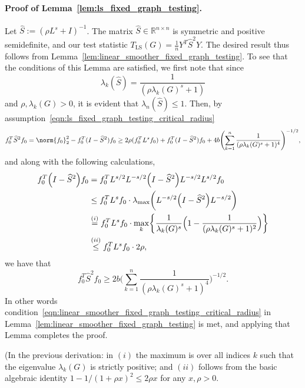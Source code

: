 \documentclass[twoside]{article}
\newcommand{\Reals}{\mathbb{R}}
\newcommand{\1}{\mathbf{1}}
\newcommand{\Lap}{L}
\newcommand{\Id}{I}
\newcommand{\wh}[1]{\widehat{#1}}
\newcommand{\LS}{\mathrm{LS}}
\theoremstyle{definition}
\theoremstyle{remark}
\begin{document}
\paragraph{Proof of Lemma~\ref{lem:ls_fixed_graph_testing}.}
Let $\wh{S} := (\rho \Lap^s + \Id)^{-1}$. The matrix $\wh{S} \in \Reals^{n \times n}$ is symmetric and positive semidefinite, and our test statistic $T_{\LS}(G) = \frac{1}{n}Y^T \wh{S}^2 Y$. The desired result thus follows from Lemma~\ref{lem:linear_smoother_fixed_graph_testing}. To see that the conditions of this Lemma are satisfied, we first note that since
\begin{equation*}
\lambda_k(\wh{S}) = \frac{1}{(\rho\lambda_k(G)^s + 1)}
\end{equation*}
and $\rho, \lambda_k(G) > 0$, it is evident that $\lambda_{n}(\wh{S}) \leq 1$.  Then, by assumption~\eqref{eqn:ls_fixed_graph_testing_critical_radius}
\begin{equation*}
f_0^{T} \wh{S}^2 f_0 = \norm{f_0}_2^2 - f_0^T(I - \wh{S}^2)f_0 \geq 2 \rho (f_0^T \Lap^s f_0) + f_0^T(I - \wh{S}^2)f_0 + 4b \Biggl(\sum_{k = 1}^{n} \frac{1}{(\rho\lambda_k(G)^s + 1)^4} \Biggr)^{-1/2},
\end{equation*}
and along with the following calculations,
\begin{equation*}
\begin{aligned}
f_0^T \Bigl(\Id - \wh{S}^2\Bigr) f_0  & = f_0^T L^{s/2} L^{-s/2}\Bigl(\Id - \wh{S}^2\Bigr) L^{-s/2} L^{s/2} f_0 \\ 
& \leq f_0^T L^{s} f_0 \cdot  \lambda_{\max}\biggl(L^{-s/2}\Bigl(\Id - \wh{S}^2\Bigr) L^{-s/2}\biggr) \\ 
& \overset{(i)}{=}  f_0^T L^{s} f_0 \cdot \max_{k} \biggl\{ \frac{1}{\lambda_k(G)^s} \Bigl(1 - \frac{1}{(\rho \lambda_k(G)^s + 1)^2}\Bigr) \biggr\} \\
& \overset{(ii)}{\leq} f_0^T L^{s} f_0 \cdot 2\rho,
\end{aligned}
\end{equation*}
we have that
\begin{equation*}
f_0^{T} \wh{S}^2 f_0 \geq 2b \biggl(\sum_{k = 1}^{n} \frac{1}{(\rho\lambda_k(G)^s + 1)^4} \biggr)^{-1/2}.
\end{equation*} 
In other words condition~\eqref{eqn:linear_smoother_fixed_graph_testing_critical_radius} in Lemma~\ref{lem:linear_smoother_fixed_graph_testing} is met, and applying that Lemma completes the proof.

(In the previous derivation: in $(i)$ the maximum is over all indices $k$ such that the eigenvalue $\lambda_k(G)$ is strictly positive; and $(ii)$ follows from the basic algebraic identity $1 - 1/(1 + \rho x)^2 \leq 2 \rho x$ for any $x, \rho > 0$.
\end{document}
